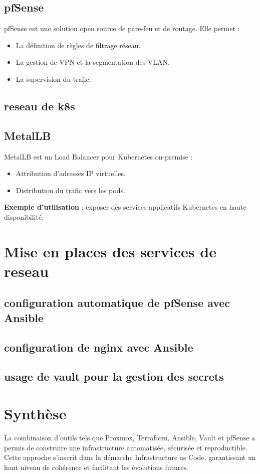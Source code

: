 \subsection{pfSense}

pfSense est une solution open source de pare-feu et de routage. Elle permet :
\begin{itemize}
    \item La définition de règles de filtrage réseau.
    \item La gestion de VPN et la segmentation des VLAN.
    \item La supervision du trafic.
\end{itemize}
\subsection{reseau de k8s}
\subsection{MetalLB}

MetalLB est un Load Balancer pour Kubernetes on-premise :
\begin{itemize}
    \item Attribution d’adresses IP virtuelles.
    \item Distribution du trafic vers les pods.
\end{itemize}

\textbf{Exemple d’utilisation} : exposer des services applicatifs Kubernetes en haute disponibilité.
\section{Mise en places des services de reseau}
\subsection{configuration automatique de pfSense avec Ansible}
\subsection{configuration de nginx avec Ansible}
\subsection{usage de vault pour la gestion des secrets}
\section{Synthèse}

La combinaison d’outils tels que Proxmox, Terraform, Ansible, Vault et pfSense a permis de construire une infrastructure automatisée, sécurisée et reproductible. Cette approche s’inscrit dans la démarche Infrastructure as Code, garantissant un haut niveau de cohérence et facilitant les évolutions futures.

